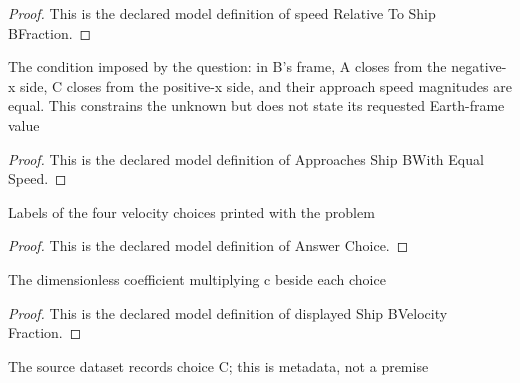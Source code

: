 \begin{proof}
  This is the declared model definition of speed Relative To Ship BFraction.
\end{proof}
\begin{definition}
  \label{def:physics:phyx-mini-0590:phyxminiproblems-problemphyxmini0590-approachesshipbwithequalspeed}
  The condition imposed by the question: in B's frame, A closes from the negative-x side, C closes from the positive-x side, and their approach speed magnitudes are equal. This constrains the unknown but does not state its requested Earth-frame value
\end{definition}
\begin{proof}
  This is the declared model definition of Approaches Ship BWith Equal Speed.
\end{proof}
\begin{definition}
  \label{def:physics:phyx-mini-0590:phyxminiproblems-problemphyxmini0590-answerchoice}
  Labels of the four velocity choices printed with the problem
\end{definition}
\begin{proof}
  This is the declared model definition of Answer Choice.
\end{proof}
\begin{definition}
  \label{def:physics:phyx-mini-0590:phyxminiproblems-problemphyxmini0590-displayedshipbvelocityfraction}
  The dimensionless coefficient multiplying c beside each choice
\end{definition}
\begin{proof}
  This is the declared model definition of displayed Ship BVelocity Fraction.
\end{proof}
\begin{definition}
  \label{def:physics:phyx-mini-0590:phyxminiproblems-problemphyxmini0590-recordeddatasetanswer}
  The source dataset records choice C; this is metadata, not a premise
\end{definition}
